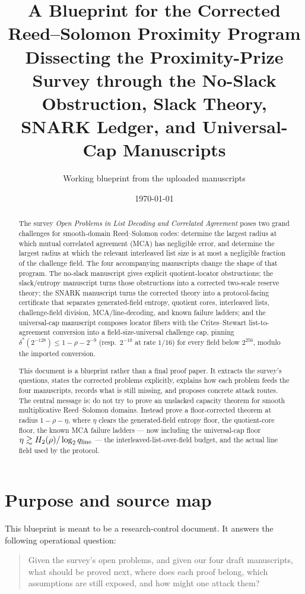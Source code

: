 \documentclass[11pt]{article}
\title{A Blueprint for the Corrected Reed--Solomon Proximity Program\\
\large Dissecting the Proximity-Prize Survey through the No-Slack Obstruction, Slack Theory,\\ \large SNARK Ledger, and Universal-Cap Manuscripts}
\author{Working blueprint from the uploaded manuscripts}
\date{\today}
\theoremstyle{definition}
\theoremstyle{remark}
\newcommand{\qline}{q_{\rm line}}
\begin{document}
\maketitle

\begin{abstract}
The survey \emph{Open Problems in List Decoding and Correlated Agreement} poses two grand challenges for smooth-domain Reed--Solomon codes: determine the largest radius at which mutual correlated agreement (MCA) has negligible error, and determine the largest radius at which the relevant interleaved list size is at most a negligible fraction of the challenge field.  The four accompanying manuscripts change the shape of that program.  The no-slack manuscript gives explicit quotient-locator obstructions; the slack/entropy manuscript turns those obstructions into a corrected two-scale reserve theory; the SNARK manuscript turns the corrected theory into a protocol-facing certificate that separates generated-field entropy, quotient cores, interleaved lists, challenge-field division, MCA/line-decoding, and known failure ladders; and the universal-cap manuscript composes locator fibers with the Crites--Stewart list-to-agreement conversion into a field-size-universal challenge cap, pinning $\delta^*(2^{-128})\le1-\rho-2^{-9}$ (resp.\ $2^{-10}$ at rate $1/16$) for every field below $2^{256}$, modulo the imported conversion.

This document is a blueprint rather than a final proof paper.  It extracts the survey's questions, states the corrected problems explicitly, explains how each problem feeds the four manuscripts, records what is still missing, and proposes concrete attack routes.  The central message is: do not try to prove an unslacked capacity theorem for smooth multiplicative Reed--Solomon domains.  Instead prove a floor-corrected theorem at radius $1-\rho-\eta$, where $\eta$ clears the generated-field entropy floor, the quotient-core floor, the known MCA failure ladders --- now including the universal-cap floor $\eta\gtrsim H_2(\rho)/\log_2\qline$ --- the interleaved-list-over-field budget, and the actual line field used by the protocol.
\end{abstract}

\tableofcontents

\section{Purpose and source map}

This blueprint is meant to be a research-control document.  It answers the following operational question:
\begin{quote}
Given the survey's open problems, and given our four draft manuscripts, what should be proved next, where does each proof belong, which assumptions are still exposed, and how might one attack them?
\end{quote}
\end{document}
